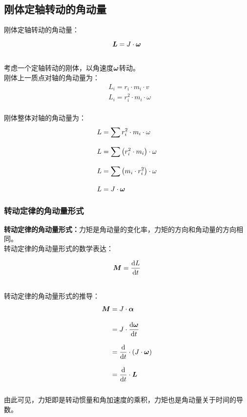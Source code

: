 \documentclass[UTF8]{ctexart}
\newcommand*{\veb}[1]{\vb*{#1}}
\newcommand*{\dif}{\mathop{}\!\mathrm{d}}
\begin{document}
\subsection{刚体定轴转动的角动量}
    \setcounter{equation}{0}
    刚体定轴转动的角动量：
    \begin{large}
        \begin{equation*}
            \veb{L}=J\cdot\veb{\omega}
        \end{equation*}
    \end{large}\\
    考虑一个定轴转动的刚体，以角速度$\veb{\omega}$转动。\\[3mm]
    刚体上一质点对轴的角动量为：
    \begin{align}
        &L_i=r_i\cdot m_i\cdot v\\[3mm]
        &L_i=r_i^2\cdot m_i\cdot\omega
    \end{align}\\
    刚体整体对轴的角动量为：
    \begin{align}
        &L=\sum r_i^2\cdot m_i\cdot\omega\\[3mm]
        &L=\sum\left(r_i^2\cdot m_i\right)\cdot\omega\\[3mm]
        &L=\sum\left(m_i\cdot r_i^2\right)\cdot\omega\\[3mm]
        &L=J\cdot\veb{\omega}
    \end{align}

\subsubsection{转动定律的角动量形式}
    \textbf{转动定律的角动量形式：}力矩是角动量的变化率，力矩的方向和角动量的方向相同。\\[3mm]
    转动定律的角动量形式的数学表达：
    \begin{large}
        \begin{equation*}
            \veb{M}=\frac{\dif L}{\dif t}
        \end{equation*}
    \end{large}\\
    转动定律的角动量形式的推导：
    \begin{align}
        \veb{M}
        &=J\cdot\veb{\alpha}\\[3mm]
        &=J\cdot\frac{\dif\veb{\omega}}{\dif t}\\[3mm]
        &=\frac{\dif}{\dif t}\cdot(J\cdot\veb{\omega})\\[3mm]
        &=\frac{\dif}{\dif t}\cdot\veb{L}
    \end{align}\\
    由此可见，力矩即是转动惯量和角加速度的乘积，力矩也是角动量关于时间的导数。
\end{document}
